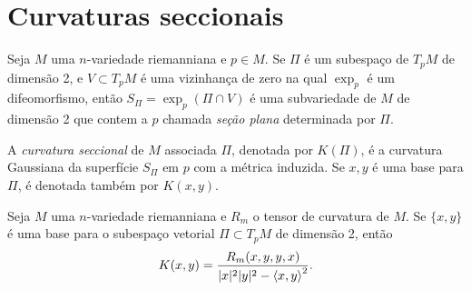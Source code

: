 \section{Curvaturas seccionais}

\begin{definicao}
	Seja $M$ uma $n$-variedade riemanniana e $p \in M$. Se $\Pi$ é um subespaço de $T_p M$ de dimensão 2, e $V \subset T_p M$ é uma vizinhança de zero  na qual $\exp_p$ é um difeomorfismo, então $S_{\Pi} = \exp_p(\Pi \cap V)$ é uma subvariedade de $M$ de dimensão 2 que contem a  $p$ chamada \emph{seção plana} determinada por $\Pi$.
\end{definicao}

\begin{definicao}
	A \emph{curvatura seccional} de $M$ associada $\Pi$, denotada por $K(\Pi)$, é a curvatura Gaussiana da superfície $S_{\Pi}$ em $p$ com a métrica induzida. Se $x,y$ é uma base para $\Pi$, é denotada também por $K(x,y)$.
\end{definicao}

\begin{proposicao}
	Seja $M$ uma $n$-variedade riemanniana e
	$R_m$ o tensor de curvatura de $M$.
	Se $\{ x,y \}$ é uma base para o subespaço vetorial $\Pi \subset T_p M$ de dimensão 2, então
	\begin{equation*}
	K(x,y) = \frac{R_m(x,y,y,x)}{|x|^2 |y|^2 - \left\langle x,y \right\rangle^2}.
	\end{equation*}
\end{proposicao}

